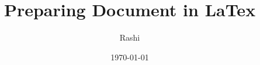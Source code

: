 \documentclass{article}
\begin{document}
	\title{Preparing Document in LaTex}
	\author{Rashi}
	\date{\today}
	\maketitle
	\blindtext
\end{document}
